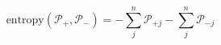 \begin{equation}
\text{entropy}(\mathcal P_+,\mathcal P_-) = -\sum_j^n\mathcal P_{+j} -\sum_j^n\mathcal P_{-j}
\end{equation}